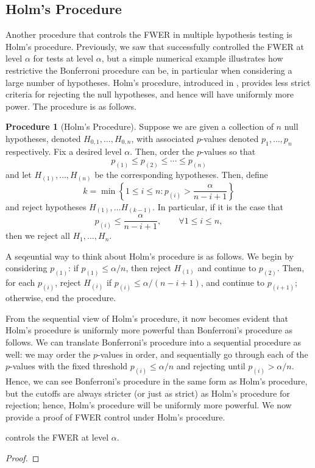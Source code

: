 \documentclass[11pt,reqno]{report}
\theoremstyle{definition}
\newtheorem{proc}[theorem]{Procedure}
\numberwithin{equation}{section}
\begin{document}
\subsection{Holm's Procedure}
Another procedure that controls the FWER in multiple hypothesis testing is Holm's procedure. Previously, we saw that  successfully controlled the FWER at level $\alpha$ for tests at level $\alpha$, but a simple numerical example illustrates how restrictive the Bonferroni procedure can be, in particular when considering a large number of hypotheses. Holm's procedure, introduced in \cite{holms}, provides less strict criteria for rejecting the null hypotheses, and hence will have uniformly more power. The procedure is as follows.
\begin{proc}[Holm's Procedure]
\label{holmproc}
Suppose we are given a collection of $n$ null hypotheses, denoted $H_{0, 1}, \ldots, H_{0, n}$, with associated $p$-values denoted $p_1, \ldots, p_n$ respectively. Fix a desired level $\alpha$. Then, order the $p$-values so that
\[ p_{(1)} \leq p_{(2)} \leq \cdots \leq p_{(n)} \] and let $H_{(1)}, \ldots, H_{(n)}$ be the corresponding hypotheses. Then, define
\[ k = \min \left\{ 1 \leq i \leq n : p_{(i)} > \frac{\alpha}{n - i + 1} \right \}  \] and reject hypotheses $H_{(1)}, \ldots H_{(k-1)}$. In particular, if it is the case that 
\[ p_{(i)} \leq \frac{\alpha}{n - i + 1}, \qquad \forall 1 \leq i \leq n, \] then we reject all $H_1, \ldots, H_n$.
\end{proc}
\begin{rmk}
A seqeuntial way to think about Holm's procedure is as follows. We begin by considering $p_{(1)}$: if $p_{(1)} \leq \alpha / n$, then reject $H_{(1)}$ and continue to $p_{(2)}$. Then, for each $p_{(i)}$, reject $H_{(i)}$ if $p_{(i)} \leq \alpha / (n - i + 1)$, and continue to $p_{(i+1)}$; otherwise, end the procedure.
\end{rmk}
From the sequential view of Holm's procedure, it now becomes evident that Holm's procedure is uniformly more powerful than Bonferroni's procedure as follows. We can translate Bonferroni's procedure into a sequential procedure as well: we may order the $p$-values in order, and sequentially go through each of the $p$-values with the fixed threshold $p_{(i)} \leq \alpha / n$ and rejecting until $p_{(i)} > \alpha / n$. Hence, we can see Bonferroni's procedure in the same form as Holm's procedure, but the cutoffs are always stricter (or just as strict) as Holm's procedure for rejection; hence, Holm's procedure will be uniformly more powerful. We now provide a proof of FWER control under Holm's procedure.
\begin{prop}
 controls the FWER at level $\alpha$.
\end{prop}
\begin{proof}

\end{proof}
\end{document}
